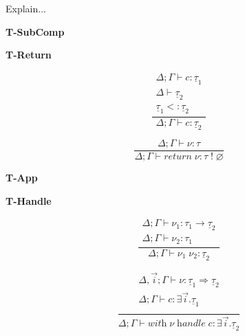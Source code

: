 \documentclass[12pt]{article}
\newcommand\ty[0]{\tau}
\newcommand\tarr[2]{#1 \rightarrow #2}
\newcommand\thandler[2]{#1 \Rightarrow #2}
\newcommand\cty[0]{\underline{\ty}}
\newcommand\aty[2]{#1 \; ! \; #2}
\newcommand\texistss[2]{\exists \overrightarrow{#1} . #2}
\newcommand\val[0]{\nu}
\newcommand\comp[0]{c}
\newcommand\creturn[1]{\textit{return} \; #1}
\newcommand\capp[2]{#1 \; #2}
\newcommand\chandle[2]{\textit{with} \; #1 \; \textit{handle} \; #2}
\newcommand\subty[2]{#1 <: #2}
\begin{document}
\newpage
Explain...\\
\begin{minipage}{0.5\textwidth}
\textbf{T-SubComp}
\end{minipage}
\begin{minipage}{0.5\textwidth}
\textbf{T-Return}
\end{minipage}
\begin{minipage}{0.5\textwidth}
\[\frac{
	\begin{array}{l}
	\Delta;\Gamma \vdash \comp : \cty_1 \\
	\Delta \vdash \cty_2 \\
	\subty{\cty_1}{\cty_2}
	\end{array}
}{
	\Delta;\Gamma \vdash \comp : \cty_2
}\]
\vspace{10pt}
\end{minipage}
\begin{minipage}{0.5\textwidth}
\[\frac{
	\Delta;\Gamma \vdash \val : \ty
}{
	\Delta;\Gamma \vdash \creturn{\val} : \aty{\ty}{\varnothing}
}\]
\vspace{10pt}
\end{minipage}
\begin{minipage}{0.5\textwidth}
\textbf{T-App}
\end{minipage}
\begin{minipage}{0.5\textwidth}
\textbf{T-Handle}
\end{minipage}
\begin{minipage}{0.5\textwidth}
\[\frac{
	\begin{array}{l}
	\Delta;\Gamma \vdash \val_1 : \tarr{\ty_1}{\cty_2} \\
	\Delta;\Gamma \vdash \val_2 : \ty_1
	\end{array}
}{
	\Delta;\Gamma \vdash \capp{\val_1}{\val_2} : \cty_2
}\]
\vspace{10pt}
\end{minipage}
\begin{minipage}{0.5\textwidth}
\[\frac{
	\begin{array}{l}
	\Delta,\overrightarrow{i};\Gamma \vdash \val : \thandler{\cty_1}{\cty_2} \\
	\Delta;\Gamma \vdash \comp : \texistss{i}{\cty_1} \\
	\end{array}
}{
	\Delta;\Gamma \vdash \chandle{\val}{\comp} : \texistss{i}{\cty_2}
}\]
\vspace{10pt}
\end{minipage}
\\
\end{document}
